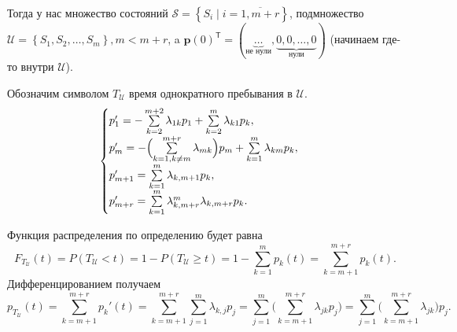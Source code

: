 \begin{ex}
  Тогда у нас множество состояний $\mathscr{S} = \left\{ S_i \mid i=\overline{1, m+r} \right\} $,
  подмножество $\mathscr U = \left\{ S_1, S_2, \dots, S_{m} \right\}, m < m+r $, 
  a $\mathbf{p}(0)^{\mathsf T} = ( \underbrace{\dots}_{\text{не нули}},
  \underbrace{0, 0, \dots, 0}_{\text{нули}})$ (начинаем где-то внутри $\mathscr U$). 

  Обозначим символом $T_{\mathscr U}$ время однократного пребывания в $\mathscr U$.
  \[
    \begin{cases}
      p_1' = - \sum\limits_{k=2}^{m+2} \lambda_{1k} p_1 + \sum\limits_{k=2}^m \lambda_{k 1}
      p_k,  \\
      p_m' = - \Bigl( \sum\limits_{k=1, k\neq m}^{m+r} \lambda_{mk} \Bigr) p_m +
      \sum\limits_{k=1}^m \lambda_{km} p_k, \\
      p_{m+1}' = \sum\limits_{k=1}^m \lambda_{k, m+1} p_k, \\
      p_{m+r}' = \sum\limits_{k=1}^m \lambda_{k, m+r}^{m} \lambda_{k, m+r} p_k.
    \end{cases}
  \]

  Функция распределения по определению будет равна
  \[
    F_{T_{\mathscr U}}(t) = P(T_{\mathscr U} < t) = 1 - P(T_{\mathscr U} \geqslant t)
    = 1 - \sum_{k=1}^m p_k(t)
    = \sum_{k=m+1}^{m+r} p_k(t).
  \]
  Дифференцированием получаем
  \[
    p_{T_{\mathscr U}}(t) = \sum_{k=m+1}^{m+r} p_k'(t)
    = \sum_{k=m+1}^{m+r} \sum_{j=1}^m \lambda_{k, j} p_j
    = \sum_{j=1}^m \biggl( \sum_{k=m+1}^{m+r} \lambda_{jk} p_j \biggr)
    = \sum_{j=1}^m \biggl( \sum_{k=m+1}^{m+r} \lambda_{jk} \biggr) p_j.
  \]
\end{ex}
